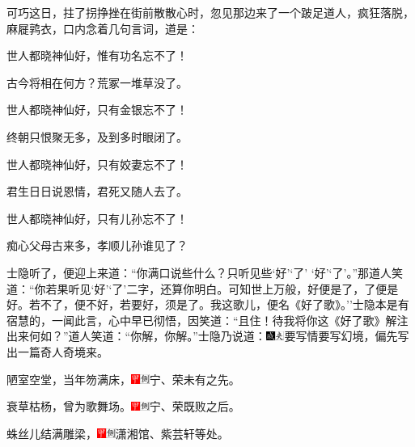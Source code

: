 可巧这日，拄了拐挣挫在街前散散心时，忽见那边来了一个跛足道人，疯狂落脱，麻屣鹑衣，口内念着几句言词，道是：

世人都晓神仙好，惟有功名忘不了！

古今将相在何方？荒冢一堆草没了。

世人都晓神仙好，只有金银忘不了！

终朝只恨聚无多，及到多时眼闭了。

世人都晓神仙好，只有姣妻忘不了！

君生日日说恩情，君死又随人去了。

世人都晓神仙好，只有儿孙忘不了！

痴心父母古来多，孝顺儿孙谁见了？

士隐听了，便迎上来道：``你满口说些什么？只听见些`好'`了'
`好'`了'。''那道人笑道：``你若果听见`好'`了'二字，还算你明白。可知世上万般，好便是了，了便是好。若不了，便不好，若要好，须是了。我这歌儿，便名《好了歌》。''士隐本是有宿慧的，一闻此言，心中早已彻悟，因笑道：``且住！待我将你这《好了歌》解注出来何如？''道人笑道：``你解，你解。''士隐乃说道：{\includegraphics[width=3mm]{../Images/00005}\includegraphics[width=3mm]{../Images/00012}\footnotesize \kaishu 要写情要写幻境，偏先写出一篇奇人奇境来。}

陋室空堂，当年笏满床，{\includegraphics[width=3mm]{../Images/00002}\includegraphics[width=3mm]{../Images/00011}\footnotesize \kaishu 宁、荣未有之先。}

衰草枯杨，曾为歌舞场。{\includegraphics[width=3mm]{../Images/00002}\includegraphics[width=3mm]{../Images/00011}\footnotesize \kaishu 宁、荣既败之后。}

蛛丝儿结满雕梁，{\includegraphics[width=3mm]{../Images/00002}\includegraphics[width=3mm]{../Images/00011}\footnotesize \kaishu 潇湘馆、紫芸轩等处。}

